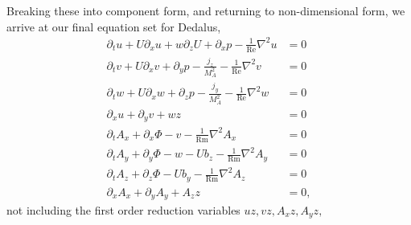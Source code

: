 \documentclass[aps,pop,preprint]{revtex4}
\newcommand{\Rm}{\mathrm{Rm}}
\renewcommand{\Re}{\mathrm{Re}}
\begin{document}
Breaking these into component form, and returning to non-dimensional form, we arrive at our final equation set for Dedalus,
\begin{align}
    \partial_t u + U\partial_x u + w \partial_z U + \partial_x p - \frac{1}{\Re} \nabla^2 u &= 0\\
    \partial_t v + U\partial_x v + \partial_y p - \frac{j_z}{M_A^2} - \frac{1}{\Re} \nabla^2 v &= 0\\
    \partial_t w + U\partial_x w + \partial_z p - \frac{j_y}{M_A^2} - \frac{1}{\Re} \nabla^2 w &= 0\\
    \partial_x u + \partial_y v + wz &= 0\\
    \partial_t A_x + \partial_x \Phi - v - \frac{1}{\Rm} \nabla^2 A_x &= 0\\
    \partial_t A_y + \partial_y \Phi - w - U b_z - \frac{1}{\Rm} \nabla^2 A_y &= 0\\
    \partial_t A_z + \partial_z \Phi - U b_y - \frac{1}{\Rm} \nabla^2 A_z &= 0\\
    \partial_x A_x + \partial_y A_y + A_zz &= 0,
\end{align}
not including the first order reduction variables $uz, vz,A_xz, A_yz,$
\end{document}
